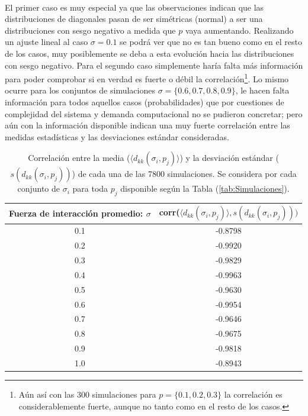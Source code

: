 \\
El primer caso es muy especial ya que las observaciones indican que las distribuciones de diagonales pasan de ser simétricas (normal) a ser una distribuciones con sesgo negativo a medida que $p$ vaya aumentando. Realizando un ajuste lineal al caso $\sigma=0.1$ se podrá ver que no es tan bueno como en el resto de los casos, muy posiblemente se deba a esta evolución hacia las distribuciones con sesgo negativo. Para el segundo caso simplemente haría falta más información para poder comprobar si en verdad es fuerte o débil la correlación\footnote{Aún así con las 300 simulaciones para $p=\{0.1,0.2,0.3\}$ la correlación es considerablemente fuerte, aunque no tanto como en el resto de los casos.}. Lo mismo ocurre para los conjuntos de simulaciones $\sigma=\{0.6,0.7,0.8,0.9\}$, le hacen falta información para todos aquellos casos (probabilidades) que por cuestiones de complejidad del sistema y demanda computacional no se pudieron concretar; pero aún con la información disponible indican una muy fuerte correlación entre las medidas estadísticas y las desviaciones estándar consideradas. 
\begin{table}[h!]
	\centering
	\begin{tabular}{|c|c|}
		\hline
		Fuerza de interacción promedio: $\sigma$ & corr($\langle d_{kk}(\sigma_i,p_j)\rangle,s(d_{kk}(\sigma_i,p_j)))$ \\ \hline
		0.1 & -0.8798 \\ \hline
		0.2 & -0.9920\\ \hline
		0.3 & -0.9829 \\ \hline
		0.4 & -0.9963\\ \hline
		0.5 & -0.9630 \\ \hline
		0.6 & -0.9954 \\ \hline
		0.7 & -0.9646 \\ \hline
		0.8 & -0.9675 \\ \hline
		0.9 & -0.9818 \\ \hline
		1.0 & -0.8943 \\ \hline
	\end{tabular}
	\caption{Correlación entre la media ($\langle d_{kk}(\sigma_i,p_j)\rangle$) y la desviación estándar ($s(d_{kk}(\sigma_i,p_j))$) de cada una de las 7800 simulaciones. Se considera por cada conjunto de $\sigma_i$ para toda $p_j$ disponible según la Tabla (\ref{tab:Simulaciones}).}
	\label{tab:Correlaciones}
\end{table} 

